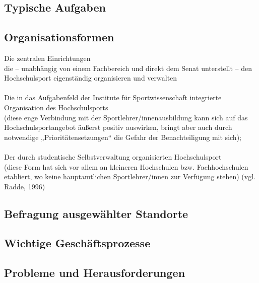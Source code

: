 \subsection{Typische Aufgaben}
\subsection{Organisationsformen}
Die zentralen Einrichtungen\\
die – unabhängig von einem Fachbereich und direkt dem Senat unterstellt – den Hochschulsport eigenständig organisieren und verwalten
\\ \\
Die in das Aufgabenfeld der Institute für Sportwissenschaft integrierte Organisation des Hochschulsports \\
(diese enge Verbindung mit der Sportlehrer/innenausbildung kann sich auf das Hochschulsportangebot äußerst positiv auswirken, bringt aber auch durch notwendige „Prioritätensetzungen“ die Gefahr der Benachteiligung mit sich);
\\ \\
Der durch studentische Selbstverwaltung organisierten Hochschulsport \\
(diese Form hat sich vor allem an kleineren Hochschulen bzw. Fachhochschulen etabliert, wo keine hauptamtlichen Sportlehrer/innen zur Verfügung stehen)
(vgl. Radde, 1996)


\subsection{Befragung ausgewählter Standorte}
\subsection{Wichtige Geschäftsprozesse}
\subsection{Probleme und Herausforderungen}